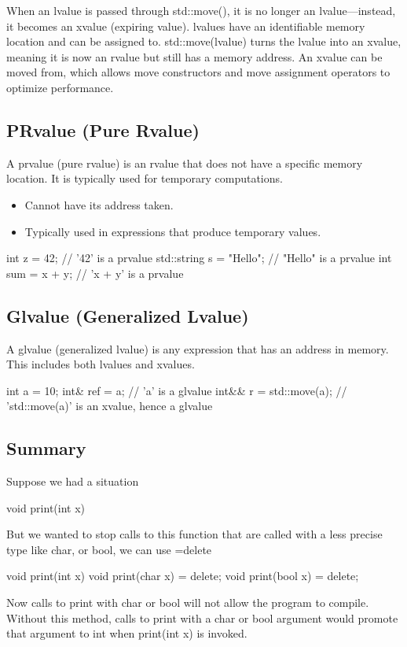 \documentclass{report}
\begin{document}
\bigbreak \noindent 
When an lvalue is passed through std::move(), it is no longer an lvalue—instead, it becomes an xvalue (expiring value).
\bigbreak \noindent 
lvalues have an identifiable memory location and can be assigned to.
\bigbreak \noindent 
std::move(lvalue) turns the lvalue into an xvalue, meaning it is now an rvalue but still has a memory address.
\bigbreak \noindent 
An xvalue can be moved from, which allows move constructors and move assignment operators to optimize performance.



\bigbreak \noindent 
\subsection{PRvalue (Pure Rvalue)}
\bigbreak \noindent 
A prvalue (pure rvalue) is an rvalue that does not have a specific memory location. It is typically used for temporary computations.
\begin{itemize}
    \item Cannot have its address taken.
    \item Typically used in expressions that produce temporary values.
\end{itemize}
\bigbreak \noindent 
\begin{cppcode}
int z = 42;         // '42' is a prvalue
std::string s = "Hello"; // "Hello" is a prvalue
int sum = x + y;    // 'x + y' is a prvalue
\end{cppcode}

\bigbreak \noindent 
\subsection{Glvalue (Generalized Lvalue)}
\bigbreak \noindent 
A glvalue (generalized lvalue) is any expression that has an address in memory. This includes both lvalues and xvalues.
\bigbreak \noindent 
\begin{cppcode}
int a = 10;
int& ref = a;  // 'a' is a glvalue
int&& r = std::move(a); // 'std::move(a)' is an xvalue, hence a glvalue
\end{cppcode}

\bigbreak \noindent 
\subsection{Summary}
\bigbreak \noindent 
{}


\pagebreak 
{}
\bigbreak \noindent 
Suppose we had a situation
\bigbreak \noindent 
\begin{cppcode}
    void print(int x) {}
\end{cppcode}
\bigbreak \noindent 
But we wanted to stop calls to this function that are called with a less precise type like char, or bool, we can use =delete
\bigbreak \noindent 
\begin{cppcode}
    void print(int x) {}
    void print(char x) = delete;
    void print(bool x) = delete;
\end{cppcode}
\bigbreak \noindent 
Now calls to print with char or bool will not allow the program to compile. Without this method, calls to print with a char or bool argument would promote that argument to int when print(int x) is invoked.
\bigbreak \noindent 
\end{document}
